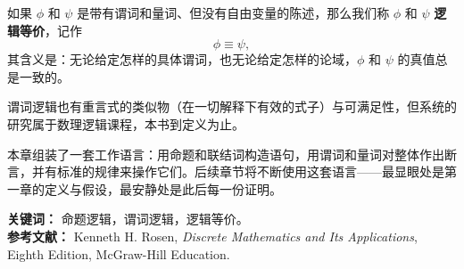 \begin{definition}[谓词逻辑中的逻辑等价]
如果 $\phi$ 和 $\psi$ 是带有谓词和量词、但没有自由变量的陈述，那么我们称 $\phi$ 和 $\psi$ \textbf{逻辑等价}，记作
\[
\phi\equiv\psi,
\]
其含义是：无论给定怎样的具体谓词，也无论给定怎样的论域，$\phi$ 和 $\psi$ 的真值总是一致的。
\end{definition}

谓词逻辑也有重言式的类似物（在一切解释下有效的式子）与可满足性，但系统的研究属于数理逻辑课程，本书到定义为止。

本章组装了一套工作语言：用命题和联结词构造语句，用谓词和量词对整体作出断言，并有标准的规律来操作它们。后续章节将不断使用这套语言——最显眼处是第一章的定义与假设，最安静处是此后每一份证明。

\noindent
\textbf{关键词：} 命题逻辑，谓词逻辑，逻辑等价。\\
\textbf{参考文献：} Kenneth H. Rosen, \textit{Discrete Mathematics and Its Applications}, Eighth Edition, McGraw-Hill Education.
